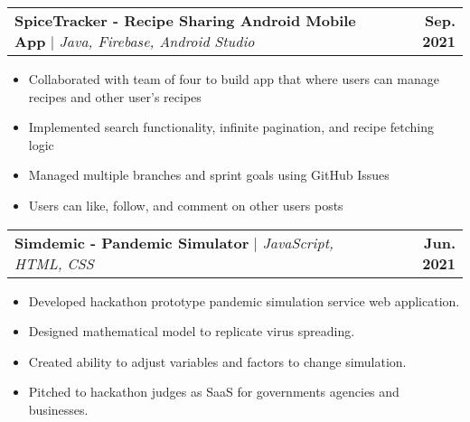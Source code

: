 \documentclass[letterpaper,11pt]{article}
\makeatletter
\newcommand{\resumeItem}[1]{
  \item\small{
    {#1 \vspace{-2pt}}
  }
}
\newcommand{\resumeProjectHeading}[2]{
    \item
    \begin{tabular*}{1.001\textwidth}{l@{\extracolsep{\fill}}r}
      \small#1 & \textbf{\small #2}\\
    \end{tabular*}\vspace{-7pt}
}
\newcommand{\resumeItemListStart}{\begin{itemize}}
\newcommand{\resumeItemListEnd}{\end{itemize}\vspace{-5pt}}
\makeatother
\begin{document}
\resumeProjectHeading
{\textbf{SpiceTracker - Recipe Sharing Android Mobile App} $|$ \emph{Java, Firebase, Android Studio}}{Sep. 2021}
\resumeItemListStart
\resumeItem{Collaborated with team of four to build app that where users can manage recipes and other user's recipes}
\resumeItem{Implemented search functionality, infinite pagination, and recipe fetching logic}
\resumeItem{Managed multiple branches and sprint goals using GitHub Issues}
\resumeItem{Users can like, follow, and comment on other users posts}
\resumeItemListEnd
\vspace{-13pt}






\resumeProjectHeading
{\textbf{Simdemic - Pandemic Simulator} $|$ \emph{JavaScript, HTML, CSS}}{Jun. 2021}
\resumeItemListStart
\resumeItem{Developed hackathon prototype pandemic simulation service web application.}
\resumeItem{Designed mathematical model to replicate virus spreading.}
\resumeItem{Created ability to adjust variables and factors to change simulation.}
\resumeItem{Pitched to hackathon judges as SaaS for governments agencies and businesses.}
\resumeItemListEnd
\end{document}
